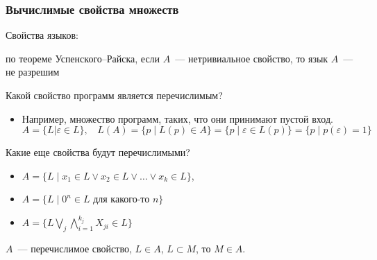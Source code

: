 \subsubsection{Вычислимые свойства множеств}
Свойства языков:

по теореме Успенского--Райска, если $A$~--- нетривиальное свойство, то язык $A$~--- не разрешим

Какой свойство программ является перечислимым?

\begin{itemize}
    \item Например, множество программ, таких, что они принимают пустой вход.
\[ A = \{  L | \varepsilon \in  L\},~~~~ L(A) = \{ p\mid L(p) \in A \} = \{ p \mid \varepsilon \in L(p) \} = \{ p \mid p(\varepsilon) = 1\} \]
\end{itemize}


Какие еще свойства будут перечислимыми?
\begin{itemize}
    \item $A = \{ L \mid x_1 \in L \vee x_2 \in L \vee \dots \vee x_k \in L \}$,
    \item $A = \{ L \mid 0^n \in L $ для какого-то $n\}$
    \item $A = \{ L \bigvee_{j}\bigwedge_{i=1}^{k_j} X_{ji} \in L  \}$
\end{itemize}


\begin{lemma}
    $A$~--- перечислимое свойство, $L \in A$, $L \subset M$, то $M \in A$.
\end{lemma}

